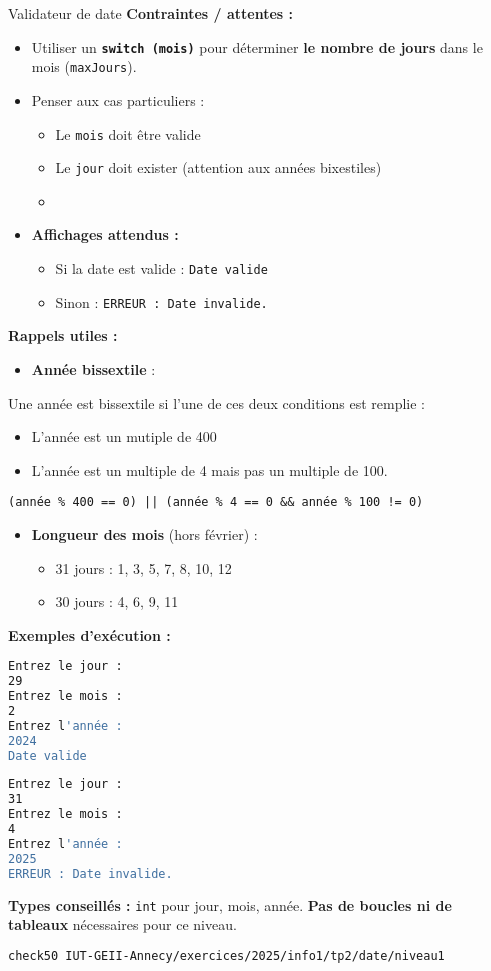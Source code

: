 \begin{UPSTIManipulation}{Validateur de date}
	\textbf{Contraintes / attentes :}
	\begin{itemize}
		\item Utiliser un \textbf{\texttt{switch (mois)}} pour déterminer \textbf{le nombre de jours} dans le mois (\texttt{maxJours}).
		\item Penser aux cas particuliers :
		      \begin{itemize}
			      \item Le \texttt{mois} doit être valide
			      \item Le \texttt{jour} doit exister (attention aux années bixestiles)
			      \item
		      \end{itemize}
		\item \textbf{Affichages attendus :}
		      \begin{itemize}
			      \item Si la date est valide : \texttt{Date valide}
			      \item Sinon : \texttt{ERREUR : Date invalide.}
		      \end{itemize}
	\end{itemize}
	\textbf{Rappels utiles :}
	\begin{itemize}
		\item \textbf{Année bissextile} :
	\end{itemize}
	Une année est bissextile si l'une de ces deux conditions est remplie :
	\begin{itemize}
		\item L'année est un mutiple de 400
		\item L'année est un multiple de 4 mais pas un multiple de 100.
	\end{itemize}
	\texttt{(année \% 400 == 0) || (année \% 4 == 0 \&\& année \% 100 != 0)}
	\begin{itemize}
		\item \textbf{Longueur des mois} (hors février) :
		      \begin{itemize}
			      \item 31 jours : 1, 3, 5, 7, 8, 10, 12
			      \item 30 jours : 4, 6, 9, 11
		      \end{itemize}
	\end{itemize}
	\textbf{Exemples d’exécution :}
	\begin{lstlisting}[language=bash]
Entrez le jour :
29
Entrez le mois :
2
Entrez l'année :
2024
Date valide
\end{lstlisting}
	\begin{lstlisting}[language=bash]
Entrez le jour :
31
Entrez le mois :
4
Entrez l'année :
2025
ERREUR : Date invalide.
\end{lstlisting}
	\textbf{Types conseillés :} \texttt{int} pour jour, mois, année.
	\textbf{Pas de boucles ni de tableaux} nécessaires pour ce niveau.
	\tcblower
	\begin{lstlisting}[language=bash]
check50 IUT-GEII-Annecy/exercices/2025/info1/tp2/date/niveau1
	\end{lstlisting}
\end{UPSTIManipulation}

